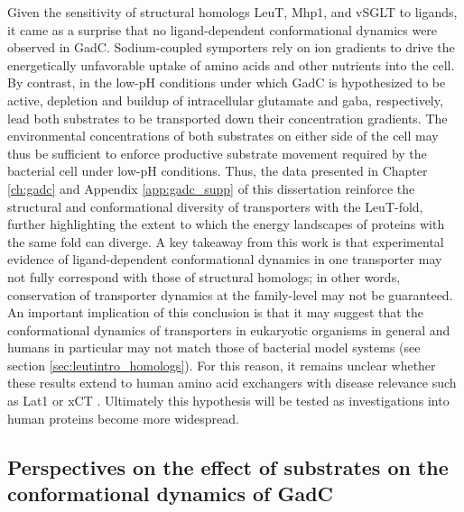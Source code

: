 Given the sensitivity of structural homologs LeuT, Mhp1, and vSGLT to ligands, it came as a surprise that no ligand-dependent conformational dynamics were observed in GadC. Sodium-coupled symporters rely on ion gradients to drive the energetically unfavorable uptake of amino acids and other nutrients into the cell. By contrast, in the low-pH conditions under which GadC is hypothesized to be active, depletion and buildup of intracellular glutamate and \gls{gaba}, respectively, lead both substrates to be transported down their concentration gradients. The environmental concentrations of both substrates on either side of the cell may thus be sufficient to enforce productive substrate movement required by the bacterial cell under low-pH conditions. Thus, the data presented in Chapter \ref{ch:gadc} and Appendix \ref{app:gadc_supp} of this dissertation reinforce the structural and conformational diversity of transporters with the LeuT-fold, further highlighting the extent to which the energy landscapes of proteins with the same fold can diverge. A key takeaway from this work is that experimental evidence of ligand-dependent conformational dynamics in one transporter may not fully correspond with those of structural homologs; in other words, conservation of transporter dynamics at the family-level may not be guaranteed. An important implication of this conclusion is that it may suggest that the conformational dynamics of transporters in eukaryotic organisms in general and humans in particular may not match those of bacterial model systems (see section \ref{sec:leutintro_homologs}). For this reason, it remains unclear whether these results extend to human amino acid exchangers with disease relevance such as Lat1 \citep*{Lee2019, Yan2019} or xCT \citep*{Oda2020}. Ultimately this hypothesis will be tested as investigations into human proteins become more widespread.

\subsection{Perspectives on the effect of substrates on the conformational dynamics of GadC}

